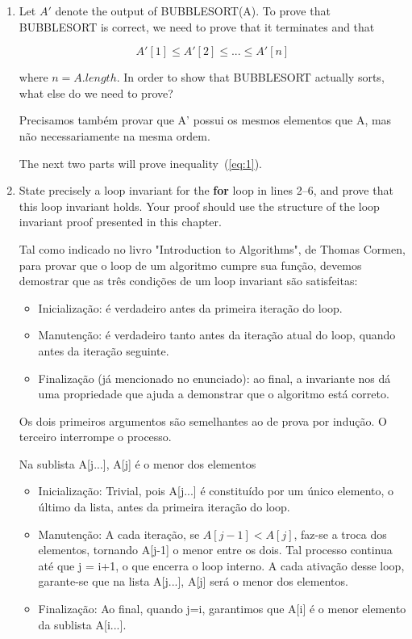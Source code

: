 \documentclass{article}
\begin{document}
\begin{enumerate}[label=\Alph*]
  \item Let $A'$ denote the output of BUBBLESORT(A). To prove that BUBBLESORT is correct, we need to prove that it terminates and that
  
  \begin{equation} \label{eq:1}
    A'[1] \leq A'[2] \leq ... \leq A'[n]
  \end{equation}
  
  where $n = A.length$. In order to show that BUBBLESORT actually sorts, what else do we need to prove?
  
  Precisamos também provar que A' possui os mesmos elementos que A, mas não necessariamente na mesma ordem.
  
  The next two parts will prove inequality~(\ref{eq:1}).
  
  \item State precisely a loop invariant for the \textbf{for} loop in lines 2–6, and prove that this loop invariant holds. Your proof should use the structure of the loop invariant proof presented in this chapter.
  
  Tal como indicado no livro "Introduction to Algorithms", de Thomas Cormen, para provar que o loop de um algoritmo cumpre sua função, devemos demostrar que as três condições de um loop invariant são satisfeitas:
  \begin{itemize}
  	\item Inicialização: é verdadeiro antes da primeira iteração do loop.
  	\item Manutenção: é verdadeiro tanto antes da iteração atual do loop, quando antes da iteração seguinte. 
  	\item Finalização (já mencionado no enunciado): ao final, a invariante nos dá uma propriedade que ajuda a demonstrar que o algoritmo está correto.
  \end{itemize}
  
  Os dois primeiros argumentos são semelhantes ao de prova por indução. O terceiro interrompe o processo.
  
  Na sublista A[j...], A[j] é o menor dos elementos
  
  \begin{itemize}
  \item Inicialização: Trivial, pois A[j...] é constituído por um único elemento, o último da lista, antes da primeira iteração do loop.
  \item Manutenção: A cada iteração, se $A[j-1] < A[j]$, faz-se a troca dos elementos, tornando A[j-1] o menor entre os dois. Tal processo continua até que j = i+1, o que encerra o loop interno. A cada ativação desse loop, garante-se que na lista A[j...], A[j] será o menor dos elementos.
  \item Finalização: Ao final, quando j=i, garantimos que A[i] é o menor elemento da sublista A[i...].
  \end{itemize}
  	

\end{enumerate}
\end{document}
